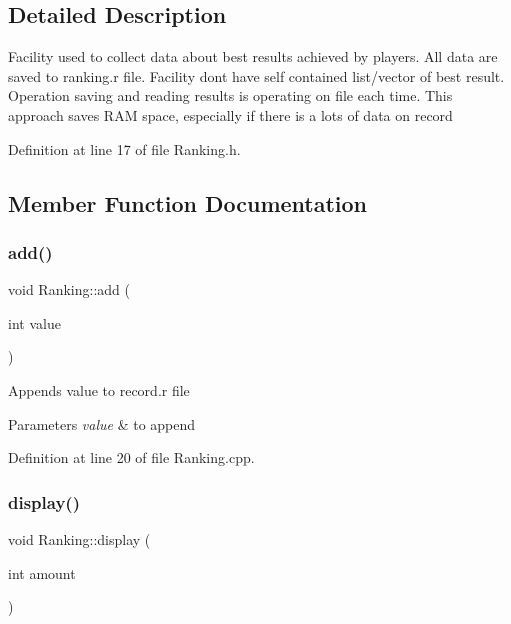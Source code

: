\subsection{Detailed Description}
Facility used to collect data about best results achieved by players. All data are saved to ranking.\+r file. Facility don\textquotesingle{}t have self contained list/vector of best result. Operation saving and reading results is operating on file each time. This approach saves R\+AM space, especially if there is a lots of data on record 

Definition at line 17 of file Ranking.\+h.



\subsection{Member Function Documentation}
\mbox{\label{classRanking_a4969110ba50a492be5d125c9b1710cf0}} 
\subsubsection{\texorpdfstring{add()}{add()}}
{\footnotesize\ttfamily void Ranking\+::add (\begin{DoxyParamCaption}\item[{int}]{value }\end{DoxyParamCaption})}

Appends value to record.\+r file 
\begin{DoxyParams}{Parameters}
{\em value} & to append \\
\hline
\end{DoxyParams}


Definition at line 20 of file Ranking.\+cpp.

\mbox{\label{classRanking_ade50abc368e58d4c7879e437f819e982}} 
\subsubsection{\texorpdfstring{display()}{display()}}
{\footnotesize\ttfamily void Ranking\+::display (\begin{DoxyParamCaption}\item[{int}]{amount }\end{DoxyParamCaption})}

